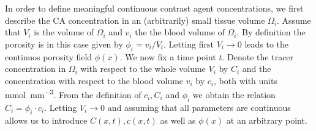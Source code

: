 \documentclass[paper=a4, fontsize=12pt,parskip=half, draft, headings=small]{scrartcl}
\newcommand{\sic}{\milli\mol\per\cubic\milli\meter}
\begin{document}
	In order to define meaningful continuous contrast agent concentrations, we first describe the CA concentration in an (arbitrarily) small tissue volume $\Omega_i$.
	Assume that $V_i$ is the volume of $\Omega_i$ and $v_i$ the the blood volume of $\Omega_i$.
	By definition the porosity is in this case given by $\phi_i = v_i/V_i$.
	Letting first $V_i \rightarrow 0$ leads to the continuos porosity field $\phi(x)$.	
	We now fix a time point $t$.
	Denote the tracer concentration in $\Omega_i$ with respect to the whole volume $V_i$ by $C_i$ and the concentration with respect to the blood volume $v_i$ by $c_i$, both with units \si{\sic}. 
	From the definition of $c_i,C_i$ and $\phi_i$ we obtain the relation $C_i = \phi_i \cdot c_i$.
	Letting $V_i \to 0$ and assuming that all parameters are continuous allows us to introduce $C(x,t),c(x,t)$ as well as $\phi(x)$ at an arbitrary point.
\end{document}
